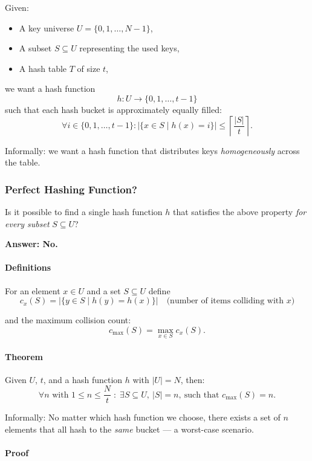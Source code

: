 \documentclass{article}
\begin{document}
Given:
\begin{itemize}
    \item A key universe $U = \{0,1,\dots,N-1\}$,
    \item A subset $S \subseteq U$ representing the used keys,
    \item A hash table $T$ of size $t$,
\end{itemize}

we want a hash function
\[
h : U \to \{0,1,\dots,t-1\}
\]
such that each hash bucket is approximately equally filled:
\[
\forall i \in \{0,1,\dots,t-1\} : 
\left|\{x \in S \mid h(x) = i\}\right|
\le \left\lceil \frac{|S|}{t} \right\rceil.
\]

Informally: we want a hash function that distributes keys \emph{homogeneously} across the table.

\subsubsection{Perfect Hashing Function?}

Is it possible to find a single hash function $h$ that satisfies the above property  
\emph{for every subset} $S \subseteq U$?

\textbf{Answer: No.}

\paragraph{Definitions}

For an element $x \in U$ and a set $S \subseteq U$ define
\[
c_x(S) 
= \bigl|\{y \in S \mid h(y)=h(x)\}\bigr|
\quad\text{(number of items colliding with $x$)}
\]

and the maximum collision count:
\[
c_{\max}(S) = \max_{x \in S} c_x(S).
\]

\paragraph{Theorem}

Given $U$, $t$, and a hash function $h$ with $|U| = N$, then:
\[
\forall n \text{ with } 1 \le n \le \frac{N}{t} \; : \;
\exists S \subseteq U,\ |S| = n,\ \text{such that } c_{\max}(S) = n.
\]

Informally:  
No matter which hash function we choose, there exists a set of $n$ elements that all hash to the \emph{same} bucket — a worst-case scenario.

\paragraph{Proof}
\end{document}

